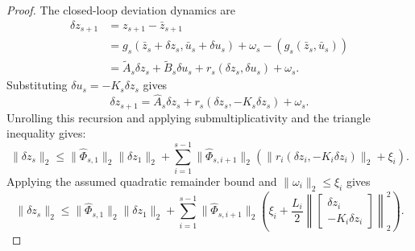 \documentclass[10pt,a4paper]{amsart}
\begin{document}
\begin{proof}
The closed-loop deviation dynamics are
\[
\begin{aligned}
    \delta z_{s+1}
    &=
    z_{s+1}-\bar z_{s+1} \\
    &=
    g_s(\bar z_s+\delta z_s,\bar u_s+\delta u_s)
    +\omega_s
    -
    \left(g_s(\bar z_s,\bar u_s)\right)\\
    &=
    \tilde A_s\delta z_s+\tilde B_s\delta u_s
    +
    r_s(\delta z_s,\delta u_s)
    +
    \omega_s.
\end{aligned}
\]
Substituting $\delta u_s=-K_s\delta z_s$ gives
\[
    \delta z_{s+1}
    =
    \widehat A_s\delta z_s
    +
    r_s(\delta z_s,-K_s\delta z_s)
    +
    \omega_s.
\]
Unrolling this recursion and applying submultiplicativity and the
triangle inequality gives:
\begin{equation}
    \|\delta z_s\|_2
    \le
    \|\widehat\Phi_{s,1}\|_2\|\delta z_1\|_2
    +
    \sum_{i=1}^{s-1}
    \|\widehat\Phi_{s,i+1}\|_2
    \left(
    \|r_i(\delta z_i,-K_i\delta z_i)\|_2
    +
    \xi_i
    \right).
\end{equation}
Applying the assumed
quadratic remainder bound and $\|\omega_i\|_2\le \xi_i$ gives
\begin{equation}
    \|\delta z_s\|_2
    \le
    \|\widehat\Phi_{s,1}\|_2\|\delta z_1\|_2
    +
    \sum_{i=1}^{s-1}
    \|\widehat\Phi_{s,i+1}\|_2
    \left(
    \xi_i
    +
    \frac{L_i}{2}
    \left\|
    \begin{bmatrix}
    \delta z_i\\
    -K_i\delta z_i
    \end{bmatrix}
    \right\|_2^2
    \right).
\end{equation}

\end{proof}
\end{document}
